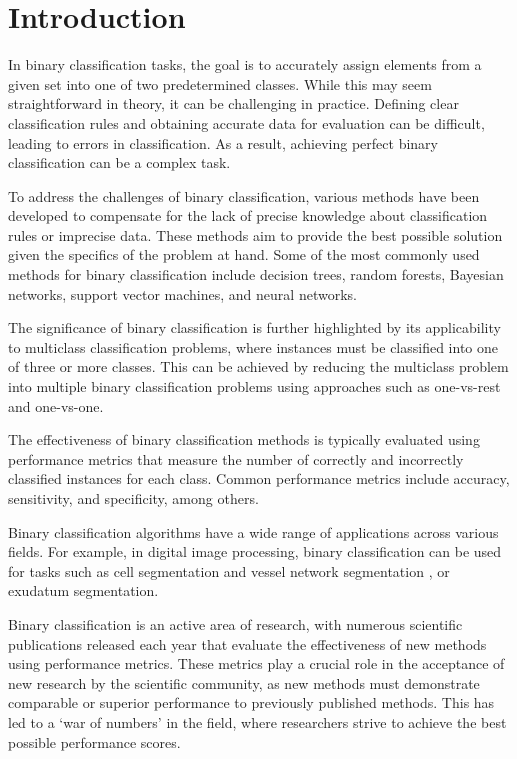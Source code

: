 \documentclass[3p,times]{elsarticle}
\begin{document}

\section{Introduction}\label{section:Introduction}

In binary classification tasks, the goal is to accurately assign elements from a given set into one of two predetermined classes. While this may seem straightforward in theory, it can be challenging in practice. Defining clear classification rules and obtaining accurate data for evaluation can be difficult, leading to errors in classification. As a result, achieving perfect binary classification can be a complex task.\cite{1}

To address the challenges of binary classification, various methods have been developed to compensate for the lack of precise knowledge about classification rules or imprecise data. These methods aim to provide the best possible solution given the specifics of the problem at hand. Some of the most commonly used methods for binary classification include decision trees, random forests, Bayesian networks, support vector machines, and neural networks.\cite{2}

The significance of binary classification is further highlighted by its applicability to multiclass classification problems, where instances must be classified into one of three or more classes. This can be achieved by reducing the multiclass problem into multiple binary classification problems using approaches such as one-vs-rest and one-vs-one.\cite{3}

The effectiveness of binary classification methods is typically evaluated using performance metrics that measure the number of correctly and incorrectly classified instances for each class. Common performance metrics include accuracy, sensitivity, and specificity, among others.\cite{4}

Binary classification algorithms have a wide range of applications across various fields. For example, in digital image processing, binary classification can be used for tasks such as cell segmentation and vessel network segmentation \cite{5,6}, or exudatum segmentation.

Binary classification is an active area of research, with numerous scientific publications released each year that evaluate the effectiveness of new methods using performance metrics. These metrics play a crucial role in the acceptance of new research by the scientific community, as new methods must demonstrate comparable or superior performance to previously published methods. This has led to a ‘war of numbers’ in the field, where researchers strive to achieve the best possible performance scores. \cite{7}
\end{document}
